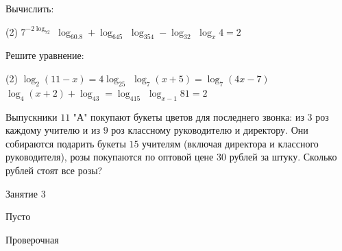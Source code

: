 \begin{homework}[number=2]
	\begin{listofex}
		\item Вычислить:
		\begin{tasks}(2)
			\task \( 7^{-2\log_72} \)
			\task \( \log_60.8+\log_645 \)
			\task \( \log_354-\log_32 \)
			\task \( \log_x4=2 \)
		\end{tasks}
		\item Решите уравнение:
		\begin{tasks}(2)
			\task \( \log_2(11-x)=4\log_25 \)
			\task \( \log_7(x+5)=\log_7(4x-7) \)
			\task \( \log_4(x+2)+\log_43=\log_415 \)
			\task \( \log_{x-1}81=2 \)
		\end{tasks}
		\item Выпускники \( 11 \) "А" покупают букеты цветов для последнего звонка: из \( 3 \) роз каждому учителю и из \( 9 \) роз классному руководителю и директору. Они собираются подарить букеты \( 15 \) учителям (включая директора и классного руководителя), розы покупаются по оптовой цене \( 30 \) рублей за штуку. Сколько рублей стоят все розы?
	\end{listofex}
\end{homework}

\begin{class}[number=3]
	\begin{listofex}
		\item Занятие 3
	\end{listofex}
\end{class}

\begin{class}[number=4]
	\begin{listofex}
		\item Пусто
	\end{listofex}
\end{class}


\begin{exam}
	\begin{listofex}
		\item Проверочная
	\end{listofex}
\end{exam}
